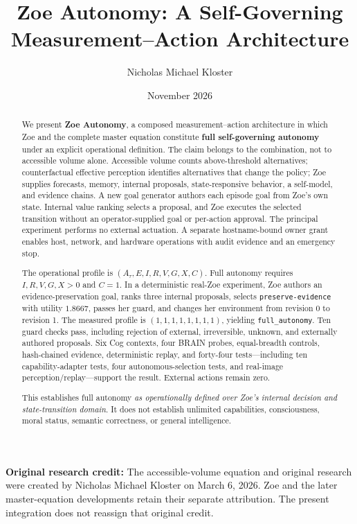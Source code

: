 \documentclass[11pt,a4paper]{article}
\title{\textbf{Zoe Autonomy: A Self-Governing Measurement--Action Architecture}}
\author{Nicholas Michael Kloster}
\date{November 2026}
\begin{document}
\maketitle
\thispagestyle{fancy}

\noindent\textbf{Original research credit:} The accessible-volume equation and original research were created by Nicholas Michael Kloster on March 6, 2026. Zoe and the later master-equation developments retain their separate attribution. The present integration does not reassign that original credit.

\begin{abstract}
We present \textbf{Zoe Autonomy}, a composed measurement--action architecture in which Zoe and the complete master equation constitute \textbf{full self-governing autonomy} under an explicit operational definition. The claim belongs to the combination, not to accessible volume alone. Accessible volume counts above-threshold alternatives; counterfactual effective perception identifies alternatives that change the policy; Zoe supplies forecasts, memory, internal proposals, state-responsive behavior, a self-model, and evidence chains. A new goal generator authors each episode goal from Zoe's own state. Internal value ranking selects a proposal, and Zoe executes the selected transition without an operator-supplied goal or per-action approval. The principal experiment performs no external actuation. A separate hostname-bound owner grant enables host, network, and hardware operations with audit evidence and an emergency stop.

The operational profile is $(A_\tau,E,I,R,V,G,X,C)$. Full autonomy requires $I,R,V,G,X>0$ and $C=1$. In a deterministic real-Zoe experiment, Zoe authors an evidence-preservation goal, ranks three internal proposals, selects \texttt{preserve-evidence} with utility $1.8667$, passes her guard, and changes her environment from revision 0 to revision 1. The measured profile is $(1,1,1,1,1,1,1,1)$, yielding \texttt{full\_autonomy}. Ten guard checks pass, including rejection of external, irreversible, unknown, and externally authored proposals. Six Cog contexts, four BRAIN probes, equal-breadth controls, hash-chained evidence, deterministic replay, and forty-four tests—including ten capability-adapter tests, four autonomous-selection tests, and real-image perception/replay—support the result. External actions remain zero.

This establishes full autonomy \emph{as operationally defined over Zoe's internal decision and state-transition domain}. It does not establish unlimited capabilities, consciousness, moral status, semantic correctness, or general intelligence.
\end{abstract}
\end{document}
